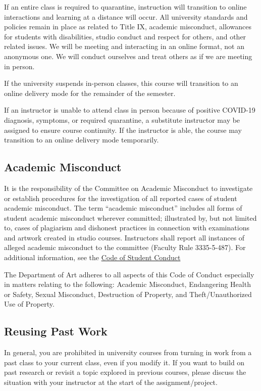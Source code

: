 \documentclass[12pt,letter,english]{report}
\begin{document}
If an entire class is required to quarantine, instruction will transition to online interactions and learning at a distance will occur. All university standards and policies remain in place as related to Title IX, academic misconduct, allowances for students with disabilities, studio conduct and respect for others, and other related issues. We will be meeting and interacting in an online format, not an anonymous one. We will conduct ourselves and treat others as if we are meeting in person.


If the university suspends in-person classes, this course will transition to an online delivery mode for the remainder of the semester.

If an instructor is unable to attend class in person because of positive COVID-19 diagnosis, symptoms, or required quarantine, a substitute instructor may be assigned to ensure course continuity. If the instructor is able, the course may transition to an online delivery mode temporarily.

\subsection{Academic Misconduct}

It is the responsibility of the Committee on Academic Misconduct to investigate or establish procedures for the investigation of all reported cases of student academic misconduct. The term ``academic misconduct'' includes all forms of student academic misconduct wherever committed; illustrated by, but not limited to, cases of plagiarism and dishonest practices in connection with examinations and artwork created in studio courses. Instructors shall report all instances of alleged academic misconduct to the committee (Faculty Rule 3335-5-487). For additional information, see the \href{https://studentconduct.osu.edu/for-students/understanding-the-student-conduct-process/}{Code of Student Conduct}

The Department of Art adheres to all aspects of this Code of Conduct especially in matters relating to the following: Academic Misconduct, Endangering Health or Safety, Sexual Misconduct, Destruction of Property, and Theft/Unauthorized Use of Property.

\subsection{Reusing Past Work}

In general, you are prohibited in university courses from turning in work from a past class to your current class, even if you modify it. If you want to build on past research or revisit a topic explored in previous courses, please discuss the situation with your instructor at the start of the assignment/project.
\end{document}
